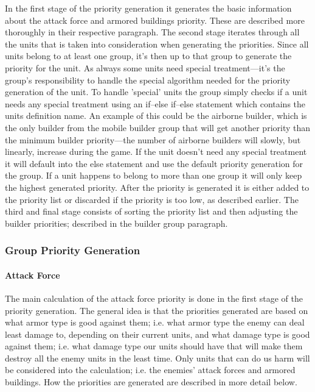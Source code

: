 In the first stage of the priority generation it generates the basic information about the attack
force and armored buildings priority. These are described more thoroughly in their respective
paragraph. The second stage iterates through all the units that is taken into consideration when
generating the priorities. Since all units belong to at least one group, it's then up to that group
to generate the priority for the unit. As always some units need special treatment---it's the group's
responsibility to handle the special algorithm needed for the priority generation of the unit. To
handle 'special' units the group simply checks if a unit needs any special treatment using an
if--else if--else statement which contains the units definition name. An example of this could be the
airborne builder, which is the only builder from the mobile builder group that will get another
priority than the minimum builder priority---the number of airborne builders will slowly, but
linearly, increase during the game. If the unit doesn't need any special treatment it will default
into the else statement and use the default priority generation for the group. If a unit happens to
belong to more than one group it will only keep the highest generated priority. After the priority is
generated it is either added to the priority list or discarded if the priority is too low, as
described earlier. The third and final stage consists of sorting the priority list and then adjusting
the builder priorities; described in the builder group paragraph.





\subsubsection{Group Priority Generation}
\paragraph{Attack Force}
The main calculation of the attack force priority is done in the first stage of
the priority generation. The general idea is that the priorities generated are
based on what armor type is good against them; i.e. what armor type the enemy can deal least damage
to, depending on their current units, and what damage type is good against
them; i.e. what damage type our units should have that will make them destroy all the enemy
units in the least time. Only units that can do us harm will be considered into the
calculation; i.e. the enemies' attack forces and armored buildings. How the priorities are generated
are described in more detail below.

